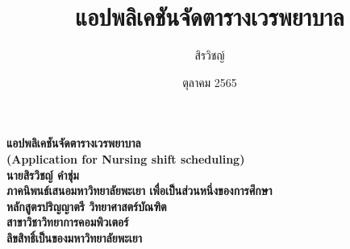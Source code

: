 \documentclass[a4paper,12pt]{upthesis}
\title{  						%
แอปพลิเคชันจัดตารางเวรพยาบาล
}
\author{สิรวิชญ์}{คำชุ่ม}
\date{ตุลาคม 2565}                                               %
\begin{document}

\thispagestyle{empty}
\begin{center} %
\Large{\textbf{แอปพลิเคชันจัดตารางเวรพยาบาล\\
(Application for Nursing shift scheduling)\\}}
\vspace{7cm}
\textbf{นายสิรวิชญ์ คำชุ่ม\\} %
\vspace{7cm}
\textbf{ภาคนิพนธ์เสนอมหาวิทยาลัยพะเยา เพื่อเป็นส่วนหนึ่งของการศึกษา\\
หลักสูตรปริญญาตรี วิทยาศาสตร์บัณฑิต\\
สาขาวิชาวิทยาการคอมพิวเตอร์\\
ลิขสิทธิ์เป็นของมหาวิทยาลัยพะเยา}
\end{center}





\end{document}
